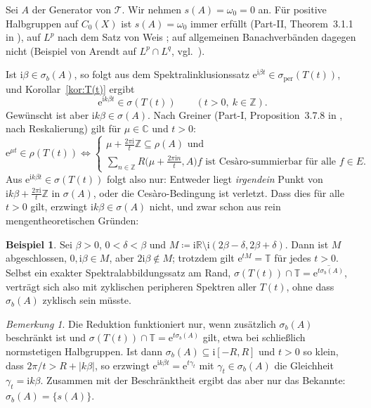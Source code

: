 \documentclass[11pt,a4paper]{article}
\theoremstyle{remark}
\newtheorem{bemerkung}[satz]{Bemerkung}
\theoremstyle{definition}
\newtheorem{beispiel}[satz]{Beispiel}
\newcommand{\C}{\mathbb{C}}
\newcommand{\R}{\mathbb{R}}
\newcommand{\Z}{\mathbb{Z}}
\newcommand{\T}{\mathbb{T}}
\newcommand{\TT}{\mathcal{T}}
\newcommand{\eu}{\mathrm{e}}
\newcommand{\im}{\mathrm{i}}
\newcommand{\sperb}{\sigma_{\mathrm{per}}}
\begin{document}
Sei $A$ der Generator von $\TT$.
Wir nehmen $s(A) = \omega_0 = 0$ an.
Für positive Halbgruppen auf $C_0(X)$ ist $s(A) = \omega_0$ immer erfüllt (Part-II, Theorem~3.1.1 in \cite{ln}), auf $L^p$ nach dem Satz von Weis \cite{weis}; auf allgemeinen Banachverbänden dagegen nicht (Beispiel von Arendt auf $L^p \cap L^q$, vgl.\ \cite{abhn}).

Ist $\im\beta \in \sigma_b(A)$, so folgt aus dem Spektralinklusionssatz $\eu^{\im\beta t} \in \sperb(T(t))$, und Korollar~\ref{kor:T(t)} ergibt
\[
  \eu^{\im k\beta t} \in \sigma(T(t)) \qquad (t > 0,\ k \in \Z).
\]
Gewünscht ist aber $\im k\beta \in \sigma(A)$.
Nach Greiner (Part-I, Proposition~3.7.8 in \cite{ln}, nach Reskalierung) gilt für $\mu \in \C$ und $t > 0$:
\[
  \eu^{\mu t} \in \rho(T(t)) \iff
  \begin{cases}
    \mu + \tfrac{2\pi\im}{t}\Z \subseteq \rho(A) \text{ und} \\[2pt]
    \sum_{n \in \Z} R\bigl(\mu + \tfrac{2\pi\im n}{t}, A\bigr)f \text{ ist Cesàro-summierbar für alle } f \in E.
  \end{cases}
\]
Aus $\eu^{\im k\beta t} \in \sigma(T(t))$ folgt also nur: Entweder liegt \emph{irgendein} Punkt von $\im k\beta + \frac{2\pi\im}{t}\Z$ in $\sigma(A)$, oder die Cesàro-Bedingung ist verletzt.
Dass dies für alle $t > 0$ gilt, erzwingt $\im k\beta \in \sigma(A)$ nicht, und zwar schon aus rein mengentheoretischen Gründen:

\begin{beispiel}\label{bsp:menge}
Sei $\beta > 0$, $0 < \delta < \beta$ und $M \coloneqq \im\R \setminus \im(2\beta - \delta, 2\beta + \delta)$.
Dann ist $M$ abgeschlossen, $0, \im\beta \in M$, aber $2\im\beta \notin M$; trotzdem gilt $\eu^{tM} = \T$ für jedes $t > 0$.
Selbst ein exakter Spektralabbildungssatz am Rand, $\sigma(T(t)) \cap \T = \overline{\eu^{t\sigma_b(A)}}$, verträgt sich also mit zyklischen peripheren Spektren aller $T(t)$, ohne dass $\sigma_b(A)$ zyklisch sein müsste.
\end{beispiel}

\begin{bemerkung}
Die Reduktion funktioniert nur, wenn zusätzlich $\sigma_b(A)$ beschränkt ist und $\sigma(T(t)) \cap \T = \eu^{t\sigma_b(A)}$ gilt, etwa bei schließlich normstetigen Halbgruppen.
Ist dann $\sigma_b(A) \subseteq \im[-R,R]$ und $t > 0$ so klein, dass $2\pi/t > R + |k\beta|$, so erzwingt $\eu^{\im k\beta t} = \eu^{t\gamma_t}$ mit $\gamma_t \in \sigma_b(A)$ die Gleichheit $\gamma_t = \im k\beta$.
Zusammen mit der Beschränktheit ergibt das aber nur das Bekannte: $\sigma_b(A) = \{s(A)\}$.
\end{bemerkung}
\end{document}
